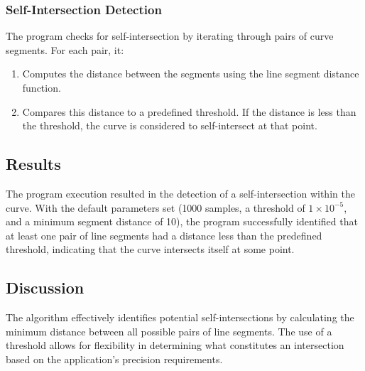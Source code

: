 \documentclass{article}
\begin{document}
\subsubsection{Self-Intersection Detection}
The program checks for self-intersection by iterating through pairs of curve segments. For each pair, it:
\begin{enumerate}
    \item Computes the distance between the segments using the line segment distance function.
    \item Compares this distance to a predefined threshold. If the distance is less than the threshold, the curve is considered to self-intersect at that point.
\end{enumerate}

\subsection{Results}
The program execution resulted in the detection of a self-intersection within the curve. With the default parameters set (1000 samples, a threshold of \(1 \times 10^{-5}\), and a minimum segment distance of 10), the program successfully identified that at least one pair of line segments had a distance less than the predefined threshold, indicating that the curve intersects itself at some point.

\subsection{Discussion}
The algorithm effectively identifies potential self-intersections by calculating the minimum distance between all possible pairs of line segments. The use of a threshold allows for flexibility in determining what constitutes an intersection based on the application's precision requirements.
\end{document}
